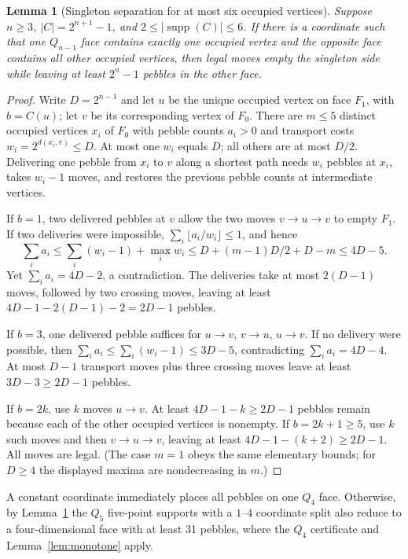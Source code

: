 \documentclass[11pt,a4paper]{article}
\newtheorem{lemma}{Lemma}
\newcommand{\supp}{\operatorname{supp}}
\begin{document}
\begin{lemma}[Singleton separation for at most six occupied vertices]\label{lem:single}
Suppose $n\ge3$, $|C|=2^{n+1}-1$, and $2\le|\supp(C)|\le6$. If there is a coordinate such that one $Q_{n-1}$ face contains exactly one occupied vertex and the opposite face contains all other occupied vertices, then legal moves empty the singleton side while leaving at least $2^n-1$ pebbles in the other face.
\end{lemma}
\begin{proof}
Write $D=2^{n-1}$ and let $u$ be the unique occupied vertex on face $F_1$, with $b=C(u)$; let $v$ be its corresponding vertex of $F_0$. There are $m\le5$ distinct occupied vertices $x_i$ of $F_0$ with pebble counts $a_i>0$ and transport costs $w_i=2^{d(x_i,v)}\le D$. At most one $w_i$ equals $D$; all others are at most $D/2$. Delivering one pebble from $x_i$ to $v$ along a shortest path needs $w_i$ pebbles at $x_i$, takes $w_i-1$ moves, and restores the previous pebble counts at intermediate vertices.

If $b=1$, two delivered pebbles at $v$ allow the two moves $v\to u\to v$ to empty $F_1$. If two deliveries were impossible, $\sum_i\lfloor a_i/w_i\rfloor\le1$, and hence
\[
 \sum_i a_i \le \sum_i(w_i-1)+\max_i w_i
 \le D+(m-1)D/2+D-m \le 4D-5.
\]
Yet $\sum_i a_i=4D-2$, a contradiction. The deliveries take at most $2(D-1)$ moves, followed by two crossing moves, leaving at least $4D-1-2(D-1)-2=2D-1$ pebbles.

If $b=3$, one delivered pebble suffices for $u\to v$, $v\to u$, $u\to v$. If no delivery were possible, then $\sum_i a_i\le\sum_i(w_i-1)\le3D-5$, contradicting $\sum_i a_i=4D-4$. At most $D-1$ transport moves plus three crossing moves leave at least $3D-3\ge2D-1$ pebbles.

If $b=2k$, use $k$ moves $u\to v$. At least $4D-1-k\ge2D-1$ pebbles remain because each of the other occupied vertices is nonempty. If $b=2k+1\ge5$, use $k$ such moves and then $v\to u\to v$, leaving at least $4D-1-(k+2)\ge2D-1$. All moves are legal. (The case $m=1$ obeys the same elementary bounds; for $D\ge4$ the displayed maxima are nondecreasing in $m$.)
\end{proof}

A constant coordinate immediately places all pebbles on one $Q_4$ face. Otherwise, by Lemma~\ref{lem:single} the $Q_5$ five-point supports with a $1$--$4$ coordinate split also reduce to a four-dimensional face with at least 31 pebbles, where the $Q_4$ certificate and Lemma~\ref{lem:monotone} apply.
\end{document}
